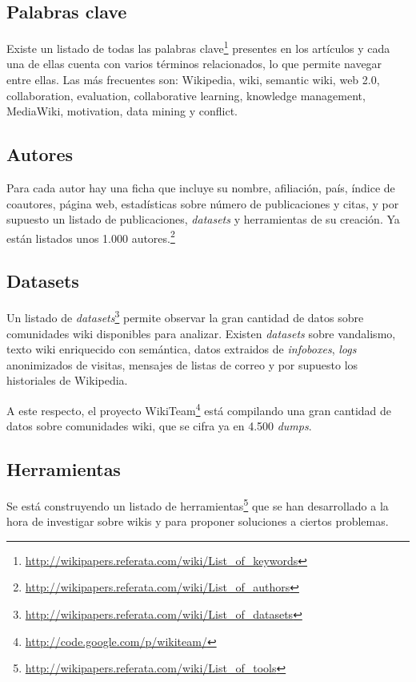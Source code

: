 \documentclass[11pt,onecolumn]{article}
\begin{document}
\subsection{Palabras clave}
Existe un listado de todas las palabras clave\footnote{\href{http://wikipapers.referata.com/wiki/List_of_keywords}{http://wikipapers.referata.com/wiki/List\_of\_keywords}} presentes en los artículos y cada una de ellas cuenta con varios términos relacionados, lo que permite navegar entre ellas. Las más frecuentes son: Wikipedia, wiki, semantic wiki, web 2.0, collaboration, evaluation, collaborative learning, knowledge management, MediaWiki, motivation, data mining y conflict. 

\subsection{Autores}
Para cada autor hay una ficha que incluye su nombre, afiliación, país, índice de coautores, página web, estadísticas sobre número de publicaciones y citas, y por supuesto un listado de publicaciones, \emph{datasets} y herramientas de su creación. Ya están listados unos 1.000 autores.\footnote{\href{http://wikipapers.referata.com/wiki/List_of_authors}{http://wikipapers.referata.com/wiki/List\_of\_authors}}

\subsection{Datasets}
Un listado de \emph{datasets}\footnote{\href{http://wikipapers.referata.com/wiki/List_of_datasets}{http://wikipapers.referata.com/wiki/List\_of\_datasets}} permite observar la gran cantidad de datos sobre comunidades wiki disponibles para analizar. Existen \emph{datasets} sobre vandalismo, texto wiki enriquecido con semántica, datos extraidos de \emph{infoboxes}, \emph{logs} anonimizados de visitas, mensajes de listas de correo y por supuesto los historiales de Wikipedia.

A este respecto, el proyecto WikiTeam\footnote{\href{http://code.google.com/p/wikiteam/}{http://code.google.com/p/wikiteam/}} está compilando una gran cantidad de datos sobre comunidades wiki, que se cifra ya en 4.500 \emph{dumps}.

\subsection{Herramientas}
Se está construyendo un listado de herramientas\footnote{\href{http://wikipapers.referata.com/wiki/List_of_tools}{http://wikipapers.referata.com/wiki/List\_of\_tools}} que se han desarrollado a la hora de investigar sobre wikis y para proponer soluciones a ciertos problemas.
\end{document}
